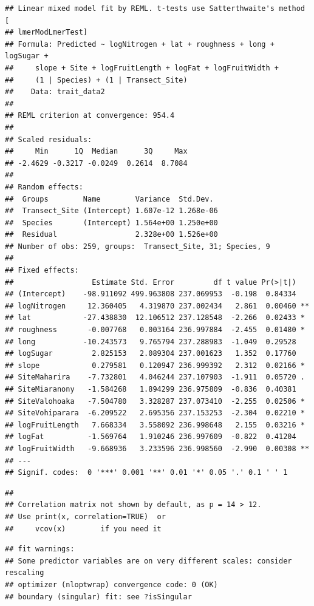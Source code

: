 \documentclass[
  12pt,
]{article}
\begin{document}
\begin{verbatim}
## Linear mixed model fit by REML. t-tests use Satterthwaite's method [
## lmerModLmerTest]
## Formula: Predicted ~ logNitrogen + lat + roughness + long + logSugar +  
##     slope + Site + logFruitLength + logFat + logFruitWidth +  
##     (1 | Species) + (1 | Transect_Site)
##    Data: trait_data2
## 
## REML criterion at convergence: 954.4
## 
## Scaled residuals: 
##     Min      1Q  Median      3Q     Max 
## -2.4629 -0.3217 -0.0249  0.2614  8.7084 
## 
## Random effects:
##  Groups        Name        Variance  Std.Dev. 
##  Transect_Site (Intercept) 1.607e-12 1.268e-06
##  Species       (Intercept) 1.564e+00 1.250e+00
##  Residual                  2.328e+00 1.526e+00
## Number of obs: 259, groups:  Transect_Site, 31; Species, 9
## 
## Fixed effects:
##                  Estimate Std. Error         df t value Pr(>|t|)   
## (Intercept)    -98.911092 499.963808 237.069953  -0.198  0.84334   
## logNitrogen     12.360405   4.319870 237.002434   2.861  0.00460 **
## lat            -27.438830  12.106512 237.128548  -2.266  0.02433 * 
## roughness       -0.007768   0.003164 236.997884  -2.455  0.01480 * 
## long           -10.243573   9.765794 237.288983  -1.049  0.29528   
## logSugar         2.825153   2.089304 237.001623   1.352  0.17760   
## slope            0.279581   0.120947 236.999392   2.312  0.02166 * 
## SiteMaharira    -7.732801   4.046244 237.107903  -1.911  0.05720 . 
## SiteMiaranony   -1.584268   1.894299 236.975809  -0.836  0.40381   
## SiteValohoaka   -7.504780   3.328287 237.073410  -2.255  0.02506 * 
## SiteVohiparara  -6.209522   2.695356 237.153253  -2.304  0.02210 * 
## logFruitLength   7.668334   3.558092 236.998648   2.155  0.03216 * 
## logFat          -1.569764   1.910246 236.997609  -0.822  0.41204   
## logFruitWidth   -9.668936   3.233596 236.998560  -2.990  0.00308 **
## ---
## Signif. codes:  0 '***' 0.001 '**' 0.01 '*' 0.05 '.' 0.1 ' ' 1
\end{verbatim}

\begin{verbatim}
## 
## Correlation matrix not shown by default, as p = 14 > 12.
## Use print(x, correlation=TRUE)  or
##     vcov(x)        if you need it
\end{verbatim}

\begin{verbatim}
## fit warnings:
## Some predictor variables are on very different scales: consider rescaling
## optimizer (nloptwrap) convergence code: 0 (OK)
## boundary (singular) fit: see ?isSingular
\end{verbatim}
\end{document}
